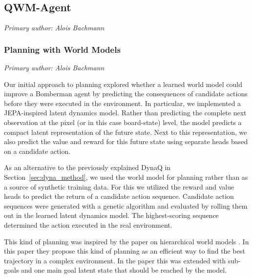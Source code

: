 

\subsection{QWM-Agent}\label{sec:qwm_agent}

\textit{Primary author: Alois Bachmann}

\subsubsection{Planning with World Models}

\textit{Primary author: Alois Bachmann}

Our initial approach to planning explored whether a learned world model could improve a Bomberman agent by predicting the consequences of candidate actions before they were executed in the environment. In particular, we implemented a JEPA-inspired latent dynamics model. Rather than predicting the complete next observation at the pixel (or in this case board-state) level, the model predicts a compact latent representation of the future state. Next to this representation, we also predict the value and reward for this future state using separate heads based on a candidate action. 

As an alternative to the previously explained DynaQ in Section~\ref{sec:dyna_method}, we used the world model for planning rather than as a source of synthetic training data. For this we utilized the reward and value heads to predict the return of a candidate action sequence. Candidate action sequences were generated with a genetic algorithm and evaluated by rolling them out in the learned latent dynamics model. The highest-scoring sequence determined the action executed in the real environment. 

This kind of planning was inspired by the paper on hierarchical world models \cite{zhang2026hwm}. In this paper they propose this kind of planning as an efficient way to find the best trajectory in a complex environment. In the paper this was extended with sub-goals and one main goal latent state that should be reached by the model. 


